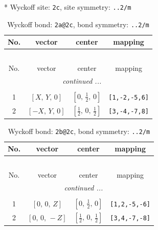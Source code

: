 \documentclass[fleqn,8pt]{jsarticle}
\begin{document}
* Wyckoff site: {\tt 2c}, site symmetry: {\tt ..2/m}
\renewcommand{\arraystretch}{1.2}
\begin{longtable}{cccc}
\caption{Wyckoff bond: {\tt 2a@2c}, bond symmetry: {\tt ..2/m}}
 \\
 \hline \hline
No. & vector & center & mapping \\ \hline \endfirsthead

\multicolumn{3}{l}{\tablename\ \thetable{}} \\
 \hline \hline
No. & vector & center & mapping \\ \hline \endhead

 \hline \hline
\multicolumn{3}{r}{\footnotesize\it continued ...} \\ \endfoot

 \hline \hline
\multicolumn{3}{r}{} \\ \endlastfoot

1 & $\left[ X,\, Y,\, 0 \right]$ & $\left[ 0,\, \frac{1}{2},\, 0 \right]$ & {\tt [1,-2,-5,6]} \\ \hline
2 & $\left[ - X,\, Y,\, 0 \right]$ & $\left[ \frac{1}{2},\, 0,\, \frac{1}{2} \right]$ & {\tt [3,-4,-7,8]} \\
\end{longtable}
\renewcommand{\arraystretch}{1.2}
\begin{longtable}{cccc}
\caption{Wyckoff bond: {\tt 2b@2c}, bond symmetry: {\tt ..2/m}}
 \\
 \hline \hline
No. & vector & center & mapping \\ \hline \endfirsthead

\multicolumn{3}{l}{\tablename\ \thetable{}} \\
 \hline \hline
No. & vector & center & mapping \\ \hline \endhead

 \hline \hline
\multicolumn{3}{r}{\footnotesize\it continued ...} \\ \endfoot

 \hline \hline
\multicolumn{3}{r}{} \\ \endlastfoot

1 & $\left[ 0,\, 0,\, Z \right]$ & $\left[ 0,\, \frac{1}{2},\, 0 \right]$ & {\tt [1,2,-5,-6]} \\ \hline
2 & $\left[ 0,\, 0,\, - Z \right]$ & $\left[ \frac{1}{2},\, 0,\, \frac{1}{2} \right]$ & {\tt [3,4,-7,-8]} \\
\end{longtable}
\renewcommand{\arraystretch}{1.2}
\end{document}
